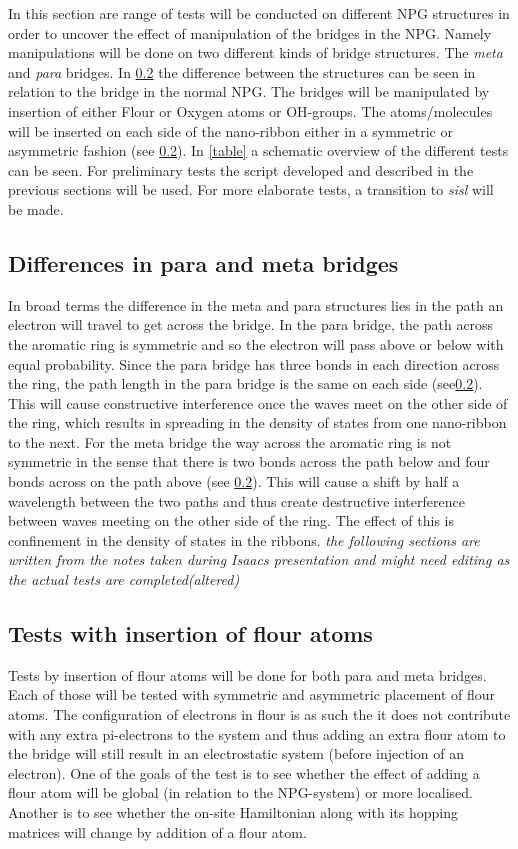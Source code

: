In this section are range of tests will be conducted on different NPG structures in order to uncover the effect of manipulation of the bridges in the NPG. Namely manipulations will be done on two different kinds of bridge structures. The \textit{meta} and \textit{para} bridges. In \cref{} the difference between the structures can be seen in relation to the bridge in the normal NPG. The bridges will be manipulated by insertion of either Flour or Oxygen atoms or OH-groups. The atoms/molecules will be inserted on each side of the nano-ribbon either in a symmetric or asymmetric fashion (see \cref{}). In \cref{table} a schematic overview of the different tests can be seen. For preliminary tests the script developed and described in the previous sections will be used. For more elaborate tests, a transition to \textit{sisl} will be made. \subsection{Differences in para and meta bridges}
In broad terms the difference in the meta and para structures lies in the path an electron will travel to get across the bridge. In the para bridge, the path across the aromatic ring is symmetric and so the electron will pass above or below with equal probability. Since the para bridge has three bonds in each direction across the ring, the path length in the para bridge is the same on each side (see\cref{}). This will cause constructive interference once the waves meet on the other side of the ring, which results in spreading in the density of states from one nano-ribbon to the next. For the meta bridge the way across the aromatic ring is not symmetric in the sense that there is two bonds across the path below and four bonds across on the path above (see \cref{}). This will cause a shift by half a wavelength between the two paths and thus create destructive interference between waves meeting on the other side of the ring. The effect of this is confinement in the density of states in the ribbons. 
\textit{the following sections are written from the notes taken during Isaacs presentation and might need editing as the actual tests are completed(altered)}
\subsection{Tests with insertion of flour atoms}
Tests by insertion of flour atoms will be done for both para and meta bridges. Each  of those will be tested with symmetric and asymmetric placement of flour atoms. The configuration of electrons in flour is as such the it does not contribute with any extra pi-electrons to the system and thus adding an extra flour atom to the bridge will still result in an electrostatic system (before injection of an electron). One of the goals of the test is to see whether the effect of adding a flour atom will be global (in relation to the NPG-system) or more localised. Another is to see whether the on-site Hamiltonian along with its hopping matrices will change by addition of a flour atom. 
